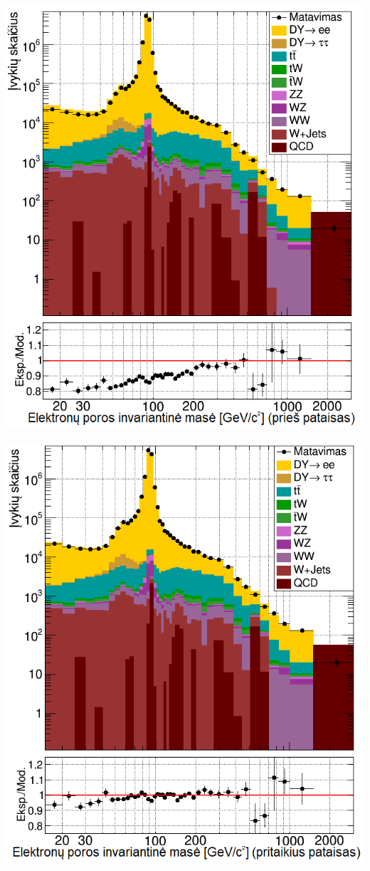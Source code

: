 \documentclass[a4paper, 12pt]{article}
\begin{document}
\begin{centering}
	\vspace{0.6cm}
	\begin{minipage}[t]{0.49\linewidth}
		\includegraphics[width=1\linewidth]{eeMassBefore_SMALL.png}
	\end{minipage}
	\hfill
	\begin{minipage}[t]{0.49\linewidth}
		\includegraphics[width=1\linewidth]{eeMassAfter_SMALL.png}

\end{minipage}
\end{centering}
\end{document}
